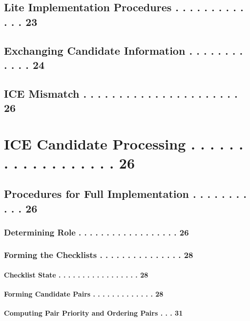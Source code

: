 \documentclass{article}
\begin{document}
\subsection{Lite Implementation Procedures  . . . . . . . . . . . . .  23}

\subsection{Exchanging Candidate Information  . . . . . . . . . . . .  24}

\subsection{ICE Mismatch  . . . . . . . . . . . . . . . . . . . . . .  26}

\section{ICE Candidate Processing  . . . . . . . . . . . . . . . . . .  26}

\subsection{Procedures for Full Implementation  . . . . . . . . . . .  26}

\subsubsection{Determining Role  . . . . . . . . . . . . . . . . . .  26}

\subsubsection{Forming the Checklists  . . . . . . . . . . . . . . .  28}

\paragraph{Checklist State . . . . . . . . . . . . . . . . .  28}

\paragraph{Forming Candidate Pairs . . . . . . . . . . . . .  28}

\paragraph{Computing Pair Priority and Ordering Pairs  . . .  31}
\end{document}
